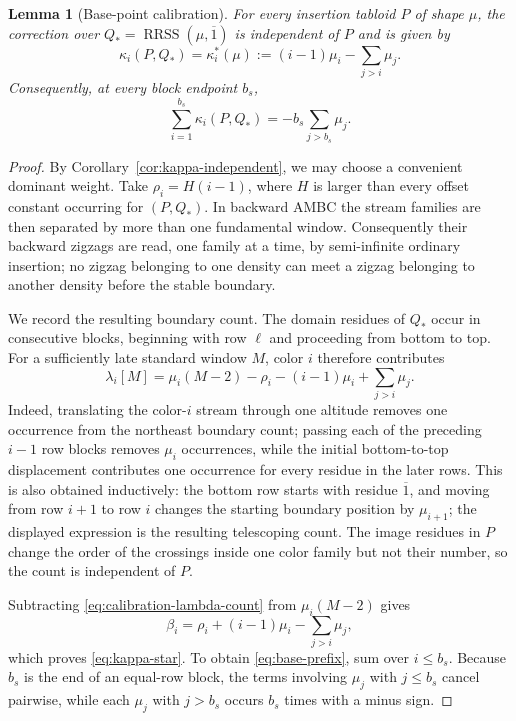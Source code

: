 \documentclass[11pt]{article}
\newtheorem{lemma}[theorem]{Lemma}
\theoremstyle{definition}
\theoremstyle{remark}
\newcommand{\ol}[1]{\overline{#1}}
\newcommand{\RRSS}{\operatorname{RRSS}}
\begin{document}
\begin{lemma}[Base-point calibration]\label{lem:base-calibration}
For every insertion tabloid \(P\) of shape \(\mu\), the correction over
\(Q_*=\RRSS(\mu,\ol1)\) is independent of \(P\) and is given by
\begin{equation}\label{eq:kappa-star}
 \kappa_i(P,Q_*)=\kappa_i^*(\mu)
 :=(i-1)\mu_i-\sum_{j>i}\mu_j.
\end{equation}
Consequently, at every block endpoint \(b_s\),
\begin{equation}\label{eq:base-prefix}
 \sum_{i=1}^{b_s}\kappa_i(P,Q_*)=-b_s\sum_{j>b_s}\mu_j.
\end{equation}
\end{lemma}

\begin{proof}
By Corollary~\ref{cor:kappa-independent}, we may choose a convenient dominant weight.
Take \(\rho_i=H(i-1)\), where \(H\) is larger than every offset constant occurring for
\((P,Q_*)\).  In backward AMBC the stream families are then separated by more than one
fundamental window.  Consequently their backward zigzags are read, one family at a
time, by semi-infinite ordinary insertion; no zigzag belonging to one density can meet
a zigzag belonging to another density before the stable boundary.

We record the resulting boundary count.  The domain residues of \(Q_*\) occur in
consecutive blocks, beginning with row \(\ell\) and proceeding from bottom to top.
For a sufficiently late standard window \(M\), color \(i\) therefore contributes
\begin{equation}\label{eq:calibration-lambda-count}
 \lambda_i[M]
 =\mu_i(M-2)-\rho_i-(i-1)\mu_i+\sum_{j>i}\mu_j.
\end{equation}
Indeed, translating the color-\(i\) stream through one altitude removes one occurrence
from the northeast boundary count; passing each of the preceding \(i-1\) row blocks
removes \(\mu_i\) occurrences, while the initial bottom-to-top displacement contributes
one occurrence for every residue in the later rows.  This is also obtained inductively:
the bottom row starts with residue \(\ol1\), and moving from row \(i+1\) to row \(i\)
changes the starting boundary position by \(\mu_{i+1}\); the displayed expression is
the resulting telescoping count.  The image residues in \(P\) change the order of the
crossings inside one color family but not their number, so the count is independent of
\(P\).

Subtracting \eqref{eq:calibration-lambda-count} from \(\mu_i(M-2)\) gives
\[
 \beta_i=\rho_i+(i-1)\mu_i-\sum_{j>i}\mu_j,
\]
which proves \eqref{eq:kappa-star}.  To obtain \eqref{eq:base-prefix}, sum over
\(i\le b_s\).  Because \(b_s\) is the end of an equal-row block, the terms involving
\(\mu_j\) with \(j\le b_s\) cancel pairwise, while each \(\mu_j\) with \(j>b_s\)
occurs \(b_s\) times with a minus sign.
\end{proof}
\end{document}
